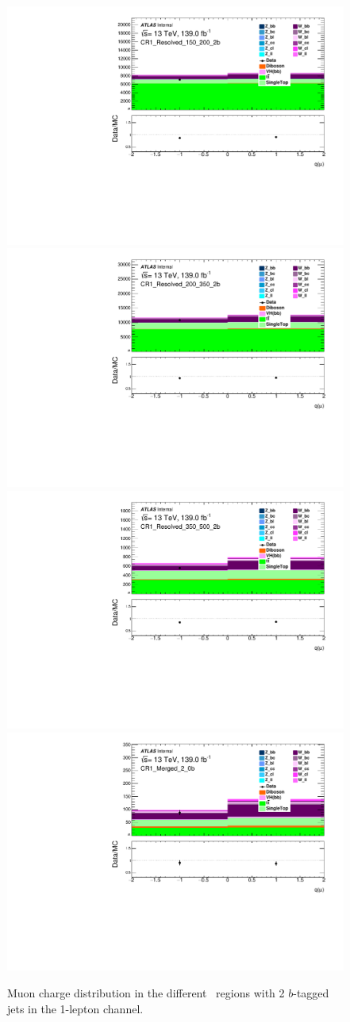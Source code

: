\begin{figure}[!htb]
    \includegraphics[width=0.46\linewidth]{chapters/c8/figures/1L/DataMC_MonoH_Nominal_CR1_Resolved_150_200_2b_mu_charge.pdf}
    \includegraphics[width=0.46\linewidth]{chapters/c8/figures/1L/DataMC_MonoH_Nominal_CR1_Resolved_200_350_2b_mu_charge.pdf}\\
    \includegraphics[width=0.46\linewidth]{chapters/c8/figures/1L/DataMC_MonoH_Nominal_CR1_Resolved_350_500_2b_mu_charge.pdf}
    \includegraphics[width=0.46\linewidth]{chapters/c8/figures/1L/DataMC_MonoH_Nominal_CR1_Merged_2_0b_mu_charge.pdf}
    \caption{Muon charge distribution in the different \met~regions with 2 $b$-tagged jets in the 1-lepton channel.}
    \label{fig:data-mc-1l-mu-charge-2b}
\end{figure}

